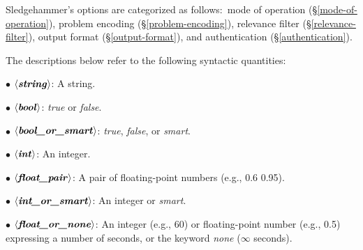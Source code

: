 \documentclass[a4paper,12pt]{article}
\begin{document}
\def\flushitem#1{\item[]\noindent\kern-\leftmargin \textbf{#1}}
\def\qty#1{$\left<\textit{#1}\right>$}
\def\qtybf#1{$\mathbf{\left<\textbf{\textit{#1}}\right>}$}
\def\optrue#1#2{\flushitem{\textit{#1} $\bigl[$= \qtybf{bool}$\bigr]$\quad [\textit{true}]\hfill (neg.: \textit{#2})}\nopagebreak\\[\parskip]}
\def\opfalse#1#2{\flushitem{\textit{#1} $\bigl[$= \qtybf{bool}$\bigr]$\quad [\textit{false}]\hfill (neg.: \textit{#2})}\nopagebreak\\[\parskip]}
\def\opsmart#1#2{\flushitem{\textit{#1} $\bigl[$= \qtybf{bool\_or\_smart}$\bigr]$\quad [\textit{smart}]\hfill (neg.: \textit{#2})}\nopagebreak\\[\parskip]}
\def\opsmartx#1#2{\flushitem{\textit{#1} $\bigl[$= \qtybf{bool\_or\_smart}$\bigr]$\quad [\textit{smart}]\hfill\\\hbox{}\hfill (neg.: \textit{#2})}\nopagebreak\\[\parskip]}
\def\opnodefault#1#2{\flushitem{\textit{#1} = \qtybf{#2}} \nopagebreak\\[\parskip]}
\def\opdefault#1#2#3{\flushitem{\textit{#1} = \qtybf{#2}\quad [\textit{#3}]} \nopagebreak\\[\parskip]}
\def\oparg#1#2#3{\flushitem{\textit{#1} \qtybf{#2} = \qtybf{#3}} \nopagebreak\\[\parskip]}
\def\opargbool#1#2#3{\flushitem{\textit{#1} \qtybf{#2} $\bigl[$= \qtybf{bool}$\bigr]$\hfill (neg.: \textit{#3})}\nopagebreak\\[\parskip]}
\def\opargboolorsmart#1#2#3{\flushitem{\textit{#1} \qtybf{#2} $\bigl[$= \qtybf{bool\_or\_smart}$\bigr]$\hfill (neg.: \textit{#3})}\nopagebreak\\[\parskip]}

Sledgehammer's options are categorized as follows:\ mode of operation
(\S\ref{mode-of-operation}), problem encoding (\S\ref{problem-encoding}),
relevance filter (\S\ref{relevance-filter}), output format
(\S\ref{output-format}), and authentication (\S\ref{authentication}).

The descriptions below refer to the following syntactic quantities:

\begin{enum}
\item[$\bullet$] \qtybf{string}: A string.
\item[$\bullet$] \qtybf{bool\/}: \textit{true} or \textit{false}.
\item[$\bullet$] \qtybf{bool\_or\_smart\/}: \textit{true}, \textit{false}, or
\textit{smart}.
\item[$\bullet$] \qtybf{int\/}: An integer.
\item[$\bullet$] \qtybf{float\_pair\/}: A pair of floating-point numbers
(e.g., 0.6 0.95).
\item[$\bullet$] \qtybf{int\_or\_smart\/}: An integer or \textit{smart}.
\item[$\bullet$] \qtybf{float\_or\_none\/}: An integer (e.g., 60) or
floating-point number (e.g., 0.5) expressing a number of seconds, or the keyword
\textit{none} ($\infty$ seconds).
\end{enum}
\end{document}
